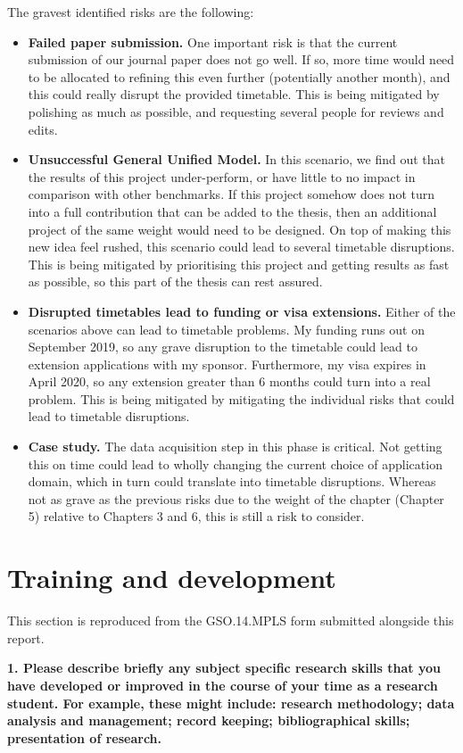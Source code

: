 \documentclass[pdftex,12pt,a4paper]{article}
\theoremstyle{definition}
\theoremstyle{remark}
\begin{document}
The gravest identified risks are the following:
\begin{itemize}
    \item \textbf{Failed paper submission.} One important risk is that the current submission of our journal paper does not go well. If so, more time would need to be allocated to refining this even further (potentially another month), and this could really disrupt the provided timetable. This is being mitigated by polishing as much as possible, and requesting several people for reviews and edits.
    \item \textbf{Unsuccessful General Unified Model.} In this scenario, we find out that the results of this project under-perform, or have little to no impact in comparison with other benchmarks. If this project somehow does not turn into a full contribution that can be added to the thesis, then an additional project of the same weight would need to be designed. On top of making this new idea feel rushed, this scenario could lead to several timetable disruptions. This is being mitigated by prioritising this project and getting results as fast as possible, so this part of the thesis can rest assured.
    \item \textbf{Disrupted timetables lead to funding or visa extensions.} Either of the scenarios above can lead to timetable problems. My funding runs out on September 2019, so any grave disruption to the timetable could lead to extension applications with my sponsor. Furthermore, my visa expires in April 2020, so any extension greater than 6 months could turn into a real problem. This is being mitigated by mitigating the individual risks that could lead to timetable disruptions.  
    \item \textbf{Case study.} The data acquisition step in this phase is critical. Not getting this on time could lead to wholly changing the current choice of application domain, which in turn could translate into timetable disruptions. Whereas not as grave as the previous risks due to the weight of the chapter (Chapter 5) relative to Chapters 3 and 6, this is still a risk to consider.
\end{itemize}

\section{Training and development}
This section is reproduced from the GSO.14.MPLS form submitted alongside this report.

\textbf{1. Please describe briefly any subject specific research skills that you have developed or improved in the course of your time as a research student. For example, these might include: research methodology; data analysis and management; record keeping; bibliographical skills; presentation of research.}
 
\end{document}
